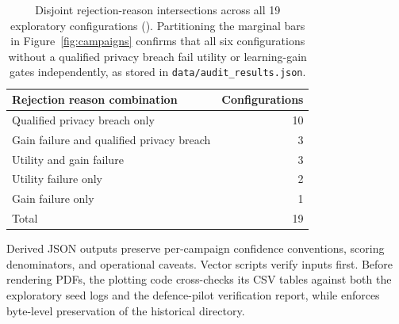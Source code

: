 \begin{table}[h]
\centering\small
\begin{tabular}{@{}lr@{}}
\toprule
Rejection reason combination & Configurations \\
\midrule
Qualified privacy breach only & 10 \\
Gain failure and qualified privacy breach & 3 \\
Utility and gain failure & 3 \\
Utility failure only & 2 \\
Gain failure only & 1 \\
\midrule
Total & 19 \\
\bottomrule
\end{tabular}
\caption{Disjoint rejection-reason intersections across all 19 exploratory
configurations (). Partitioning the marginal bars in
Figure~\ref{fig:campaigns} confirms that all six configurations without a
qualified privacy breach fail utility or learning-gain gates independently,
as stored in \texttt{data/audit\_results.json}.}
\label{tab:intersections}
\end{table}

Derived JSON outputs preserve per-campaign confidence conventions, scoring
denominators, and operational caveats. Vector scripts verify inputs first.
Before rendering PDFs, the plotting code cross-checks its CSV tables against
both the exploratory seed logs and the defence-pilot verification report,
while  enforces byte-level preservation of the historical
 directory.
